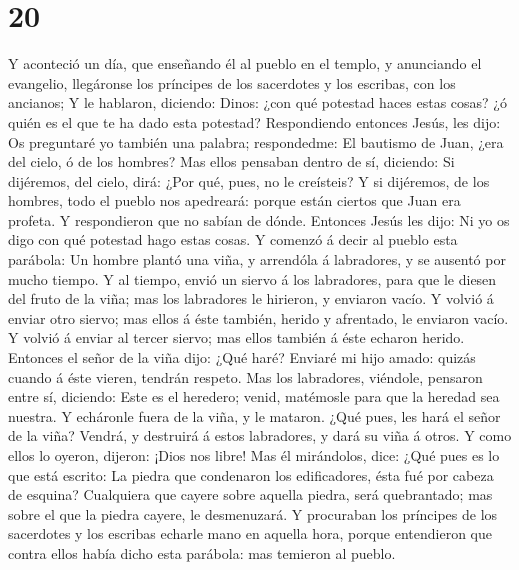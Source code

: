 \hypertarget{section-19}{%
\section{20}\label{section-19}}

 Y aconteció un día, que enseñando él al pueblo en el
templo, y anunciando el evangelio, llegáronse los príncipes de los
sacerdotes y los escribas, con los ancianos;  Y le
hablaron, diciendo: Dinos: ¿con qué potestad haces estas cosas? ¿ó quién
es el que te ha dado esta potestad?  Respondiendo entonces
Jesús, les dijo: Os preguntaré yo también una palabra; respondedme:
 El bautismo de Juan, ¿era del cielo, ó de los hombres?
 Mas ellos pensaban dentro de sí, diciendo: Si dijéremos,
del cielo, dirá: ¿Por qué, pues, no le creísteis?  Y si
dijéremos, de los hombres, todo el pueblo nos apedreará: porque están
ciertos que Juan era profeta.  Y respondieron que no
sabían de dónde.  Entonces Jesús les dijo: Ni yo os digo
con qué potestad hago estas cosas.  Y comenzó á decir al
pueblo esta parábola: Un hombre plantó una viña, y arrendóla á
labradores, y se ausentó por mucho tiempo.  Y al tiempo,
envió un siervo á los labradores, para que le diesen del fruto de la
viña; mas los labradores le hirieron, y enviaron vacío. 
Y volvió á enviar otro siervo; mas ellos á éste también, herido y
afrentado, le enviaron vacío.  Y volvió á enviar al
tercer siervo; mas ellos también á éste echaron herido. 
Entonces el señor de la viña dijo: ¿Qué haré? Enviaré mi hijo amado:
quizás cuando á éste vieren, tendrán respeto.  Mas los
labradores, viéndole, pensaron entre sí, diciendo: Este es el heredero;
venid, matémosle para que la heredad sea nuestra.  Y
echáronle fuera de la viña, y le mataron. ¿Qué pues, les hará el señor
de la viña?  Vendrá, y destruirá á estos labradores, y
dará su viña á otros. Y como ellos lo oyeron, dijeron: ¡Dios nos libre!
 Mas él mirándolos, dice: ¿Qué pues es lo que está
escrito: La piedra que condenaron los edificadores, ésta fué por cabeza
de esquina?  Cualquiera que cayere sobre aquella piedra,
será quebrantado; mas sobre el que la piedra cayere, le desmenuzará.
 Y procuraban los príncipes de los sacerdotes y los
escribas echarle mano en aquella hora, porque entendieron que contra
ellos había dicho esta parábola: mas temieron al pueblo. 
